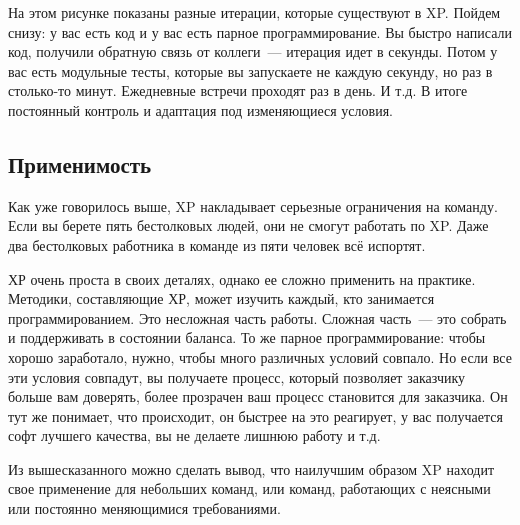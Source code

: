 \documentclass{../../text-style}
\begin{document}
На этом рисунке показаны разные итерации, которые существуют в XP. Пойдем снизу: у вас есть код и у вас есть парное программирование. Вы быстро написали код, получили обратную связь от коллеги~--- итерация идет в секунды. Потом у вас есть модульные тесты, которые вы запускаете не каждую секунду, но раз в столько-то минут. Ежедневные встречи проходят раз в день. И т.д. В итоге постоянный контроль и адаптация под изменяющиеся условия.

\subsection{Применимость}

Как уже говорилось выше, XP накладывает серьезные ограничения на команду. Если вы берете пять бестолковых людей, они не смогут работать по XP. Даже два бестолковых работника в команде из пяти человек всё испортят.

ХР очень проста в своих деталях, однако ее сложно применить на практике. Методики, составляющие ХР, может изучить каждый, кто занимается программированием. Это несложная часть работы. Сложная часть~--- это собрать и поддерживать в состоянии баланса. То же парное программирование: чтобы хорошо заработало, нужно, чтобы много различных условий совпало. Но если все эти условия совпадут, вы получаете процесс, который позволяет заказчику больше вам доверять, более прозрачен ваш процесс становится для заказчика. Он тут же понимает, что происходит, он быстрее на это реагирует, у вас получается софт лучшего качества, вы не делаете лишнюю работу и т.д.

Из вышесказанного можно сделать вывод, что наилучшим образом XP находит свое применение для небольших команд, или команд, работающих с неясными или постоянно меняющимися требованиями. 
\end{document}
